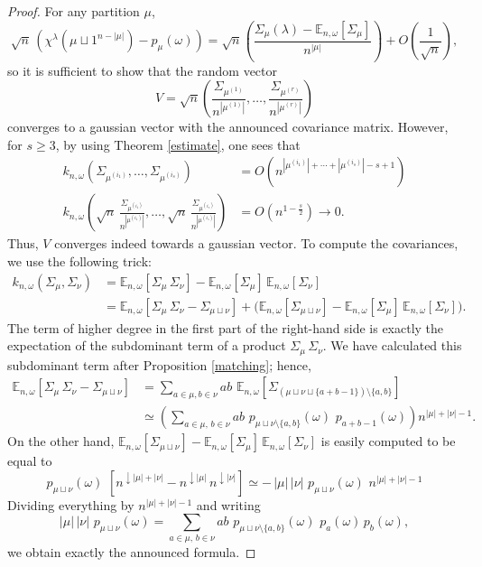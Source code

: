 \documentclass[smallextended,nospthms]{svjour3}
\theoremstyle{remark}
\newcommand{\esper}{\mathbb{E}}
\begin{document}
\begin{proof}
For any partition $\mu$,
$$\sqrt{n}\,\left(\chi^{\lambda}(\mu\sqcup 1^{n-|\mu|})-p_{\mu}(\omega)\right)=\sqrt{n} \left(\frac{\varSigma_{\mu}(\lambda)-\esper_{n,\omega}[\varSigma_{\mu}]}{n^{|\mu|}}\right)+O\left(\frac{1}{\sqrt{n}}\right),$$
so it is sufficient to show that the random vector 
$$V=\sqrt{n}\left(\frac{\varSigma_{\mu^{(1)}}}{n^{|\mu^{(1)}|}},\ldots,\frac{\varSigma_{\mu^{(r)}}}{n^{|\mu^{(r)}|}}\right)$$
converges to a gaussian vector with the announced covariance matrix. However, for $s\geq 3$, by using Theorem \ref{estimate}, one sees that
\begin{align*}
k_{n,\omega}\left(\varSigma_{\mu^{(i_{1})}},\ldots,\varSigma_{\mu^{(i_{s})}}\right)&=O\left(n^{|\mu^{(i_{1})}|+\cdots+|\mu^{(i_{s})}|-s+1}\right)\\
k_{n,\omega}\left(\sqrt{n}\,\frac{\varSigma_{\mu^{(i_{1})}} }{n^{|\mu^{(i_{1})}|}},\ldots,\sqrt{n}\,\frac{\varSigma_{\mu^{(i_{s})}} }{n^{|\mu^{(i_{s})}|}} \right)&=O\left(n^{1-\frac{s}{2}}\right)\to 0.
\end{align*}
Thus, $V$ converges indeed towards a gaussian vector. To compute the covariances, we use the following trick:
\begin{align*}k_{n,\omega}(\varSigma_{\mu},\varSigma_{\nu})&=\esper_{n,\omega}[\varSigma_{\mu}\,\varSigma_{\nu}]-\esper_{n,\omega}[\varSigma_{\mu}]\,\esper_{n,\omega}[\varSigma_{\nu}]\\
&=\esper_{n,\omega}[\varSigma_{\mu}\,\varSigma_{\nu}-\varSigma_{\mu\sqcup \nu}]+\big(\esper_{n,\omega}[\varSigma_{\mu\sqcup\nu}]-\esper_{n,\omega}[\varSigma_{\mu}]\,\esper_{n,\omega}[\varSigma_{\nu}]\big).
\end{align*}
The term of higher degree in the first part of the right-hand side is exactly the expectation of the subdominant term of a product $\varSigma_{\mu}\,\varSigma_{\nu}$. We have calculated this subdominant term after Proposition \ref{matching}; hence,
\begin{align*}
\esper_{n,\omega}[\varSigma_{\mu}\,\varSigma_{\nu}-\varSigma_{\mu\sqcup \nu}]&=\sum_{a \in \mu,b \in \nu}ab\,\,\esper_{n,\omega}[\varSigma_{(\mu\sqcup\nu \sqcup \{a+b-1\}) \setminus \{a,b\}}]\\
&\simeq \left(\sum_{a \in \mu,\,b \in \nu}ab\,\, p_{\mu\sqcup\nu \setminus \{a,b\}}(\omega)\,\,p_{a+b-1}(\omega)\right)n^{|\mu|+|\nu|-1}.
\end{align*}
On the other hand, $\esper_{n,\omega}[\varSigma_{\mu\sqcup\nu}]-\esper_{n,\omega}[\varSigma_{\mu}]\,\esper_{n,\omega}[\varSigma_{\nu}]$ is easily computed to be equal to 
$$p_{\mu \sqcup \nu}(\omega) \,\,\left[n^{\downarrow |\mu|+|\nu|}-n^{\downarrow |\mu|}\,n^{\downarrow |\nu|}\right]\simeq - \,|\mu|\,|\nu|\,\,p_{\mu \sqcup \nu}(\omega) \,\,n^{|\mu|+|\nu|-1}$$
Dividing everything by $n^{|\mu|+|\nu|-1}$ and writing
$$|\mu|\,|\nu|\,\,p_{\mu \sqcup \nu}(\omega)=\sum_{a\in \mu,\,b\in \nu}ab\,\,p_{\mu\sqcup\nu \setminus \{a,b\}}(\omega)\,\,p_{a}(\omega)\,p_{b}(\omega),$$
we obtain exactly the announced formula.
\end{proof}
\bigskip
\bigskip
\end{document}
